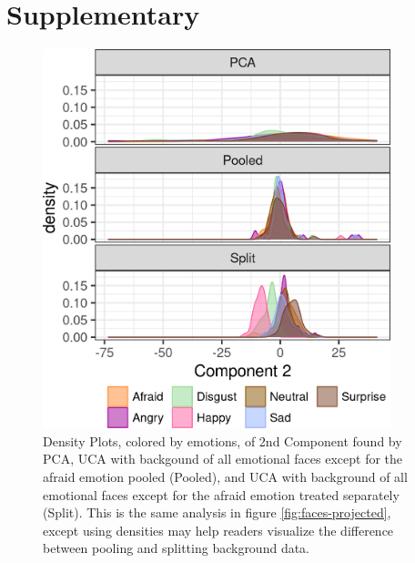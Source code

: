 \documentclass[12pt]{article}
\begin{document}
\section{Supplementary}
\begin{figure}[th!]
  \centering
  \includegraphics[width = 0.9\textwidth]{figure/PC2_density.png}
  \caption{Density Plots, colored by emotions, of 2nd Component found by PCA, UCA with backgound of all emotional faces except for the afraid emotion pooled (Pooled), and UCA with background of all emotional faces except for the afraid emotion treated separately (Split). This is the same analysis in figure \ref{fig:faces-projected}, except using densities may help readers visualize the difference between pooling and splitting background data.}
  \label{fig:FacesDensity}
\end{figure}


\end{document}
